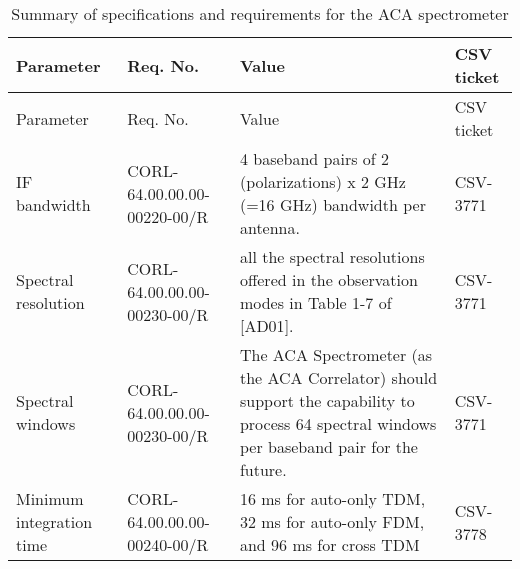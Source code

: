 \begin{longtable}{|p{3cm}|p{2cm}|p{6cm}|p{2cm}|}
\caption{Summary of specifications and requirements for the ACA spectrometer\label{tab:label}}\\ \hline
Parameter                         & Req. No.                                     & Value                                                                                                                                                                                                                                        & CSV ticket                                                 \\ \hline 
\endfirsthead
\hline
Parameter                         & Req. No.                                     & Value                                                                                                                                                                                                                                        & CSV ticket                                                 \\ \hline 
\endhead
IF bandwidth                      & CORL-64.00.00.00-00220-00/R                  & 4 baseband pairs of 2 (polarizations) x 2 GHz (=16 GHz) bandwidth per antenna.                                                                                                                                                               & CSV-3771                                                   \\ \hline 
Spectral resolution               & CORL-64.00.00.00-00230-00/R                  & all the spectral resolutions offered in the observation modes in Table 1-7 of {[}AD01{]}.                                                                                                                                                    & CSV-3771                                                            \\ \hline 
Spectral windows                  & CORL-64.00.00.00-00230-00/R                  & The ACA Spectrometer (as the ACA Correlator) should support the capability to process 64 spectral windows per baseband pair for the future.                                                                                                                                                                                             & CSV-3771                                                            \\ \hline 
Minimum integration time          & CORL-64.00.00.00-00240-00/R                  &     16 ms for auto-only TDM, 32 ms for auto-only FDM, and 96 ms for cross TDM                                                                                                                                                                                                                                         & CSV-3778                                                           \\ \hline

\end{longtable}
